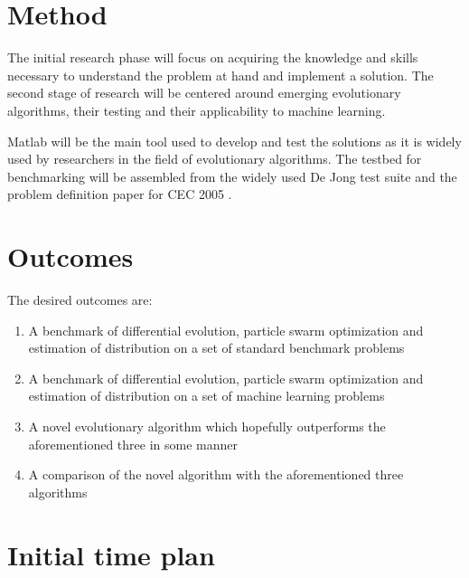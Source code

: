 \documentclass[12pt, titlepage, a4paper]{article}
\begin{document}
\section{Method}

The initial research phase will focus on acquiring the knowledge and skills necessary to understand the problem at hand and implement a solution. The second stage of research will be centered around emerging evolutionary algorithms, their testing and their applicability to machine learning.

Matlab will be the main tool used to develop and test the solutions as it is widely used by researchers in the field of evolutionary algorithms. The testbed for benchmarking will be assembled from the widely used De Jong test suite \cite{Whitley1996245} and the problem definition paper for CEC 2005 \cite{suganthan2005problem}.

\section{Outcomes}

The desired outcomes are:

\begin{enumerate}
  \item A benchmark of differential evolution, particle swarm optimization and estimation of distribution on a set of standard benchmark problems
  \item A benchmark of differential evolution, particle swarm optimization and estimation of distribution on a set of machine learning problems
  \item A novel evolutionary algorithm which hopefully outperforms the aforementioned three in some manner
  \item A comparison of the novel algorithm with the aforementioned three algorithms
\end{enumerate}

\section{Initial time plan}
\end{document}
